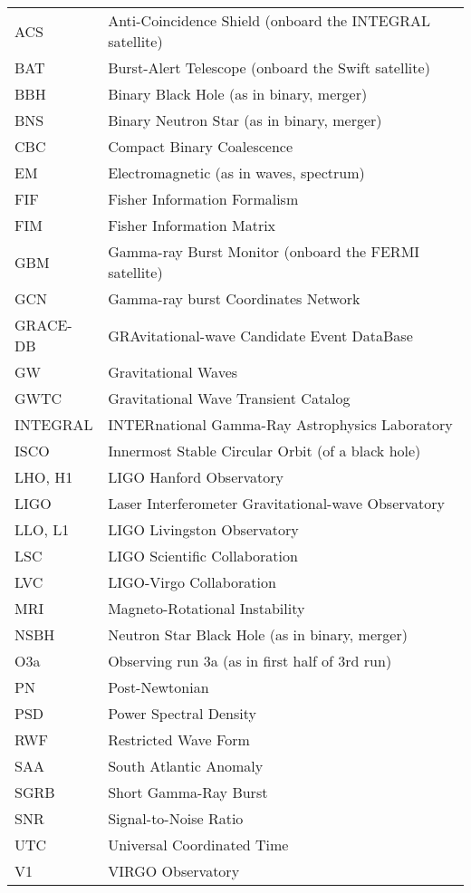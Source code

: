 \begin{longtable}[l]{l l}
    ACS & Anti-Coincidence Shield (onboard the INTEGRAL satellite) \\
    BAT & Burst-Alert Telescope (onboard the Swift satellite) \\
    BBH & Binary Black Hole (as in binary, merger) \\
    BNS & Binary Neutron Star (as in binary, merger) \\
    CBC & Compact Binary Coalescence \\
    EM & Electromagnetic (as in waves, spectrum) \\
    FIF & Fisher Information Formalism \\
    FIM & Fisher Information Matrix \\
    GBM & Gamma-ray Burst Monitor (onboard the FERMI satellite) \\
    GCN & Gamma-ray burst Coordinates Network \\
    GRACE-DB & GRAvitational-wave Candidate Event DataBase \\
    GW & Gravitational Waves \\
    GWTC & Gravitational Wave Transient Catalog \\
    INTEGRAL & INTERnational Gamma-Ray Astrophysics Laboratory \\
    ISCO & Innermost Stable Circular Orbit (of a black hole) \\
    LHO, H1 & LIGO Hanford Observatory \\
    LIGO & Laser Interferometer Gravitational-wave Observatory \\
    LLO, L1 & LIGO Livingston Observatory \\
    LSC & LIGO Scientific Collaboration \\
    LVC & LIGO-Virgo Collaboration \\
    MRI & Magneto-Rotational Instability \\
    NSBH & Neutron Star Black Hole (as in binary, merger) \\
    O3a & Observing run 3a (as in first half of 3rd run) \\
    PN & Post-Newtonian \\
    PSD & Power Spectral Density \\
    RWF & Restricted Wave Form \\
    SAA & South Atlantic Anomaly \\
    SGRB & Short Gamma-Ray Burst \\
    SNR & Signal-to-Noise Ratio \\
    UTC & Universal Coordinated Time \\
    V1 & VIRGO Observatory \\
\end{longtable}
